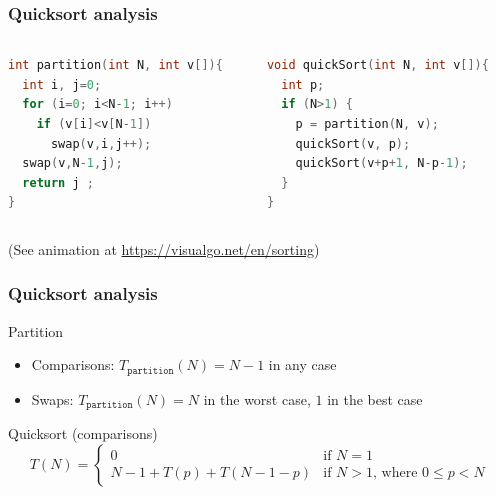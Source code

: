 \documentclass[aspectratio=169]{beamer}
\begin{document}
\begin{frame}[fragile]\frametitle{Quicksort analysis}
    
\begin{columns}
\begin{column}{0.48\textwidth}
\begin{lstlisting}[language=C++,emph={partition,quickSort,swap}]
int partition(int N, int v[]){
  int i, j=0;
  for (i=0; i<N-1; i++)
    if (v[i]<v[N-1])
      swap(v,i,j++);
  swap(v,N-1,j);
  return j ;
}
\end{lstlisting}
\end{column}
\begin{column}{0.48\textwidth}
\begin{lstlisting}[language=C++,emph={partition,quickSort}]
void quickSort(int N, int v[]){
  int p;
  if (N>1) {
    p = partition(N, v);
    quickSort(v, p);
    quickSort(v+p+1, N-p-1);
  }
}
\end{lstlisting}
\end{column}
\end{columns}

(See animation at \url{https://visualgo.net/en/sorting})

\end{frame}


\begin{frame}\frametitle{Quicksort analysis}
    
  \begin{block}{Partition}
  \begin{itemize}
    \item Comparisons: $T_{\texttt{partition}}(N) = N-1$ in any case
    \item Swaps: $T_{\texttt{partition}}(N) = N$ in the worst case, $1$ in the best case
  \end{itemize}  
  \end{block}

  \begin{block}{Quicksort (comparisons)}
  $$T(N) = \left\{
    \begin{array}{ll}
      0 & \text{if }N=1
      \\
      N-1 + T(p) + T(N-1-p) & \text{if }N>1\text{, where }0\leq p < N
    \end{array}
  \right.$$
  \end{block}
\end{frame}
\end{document}
